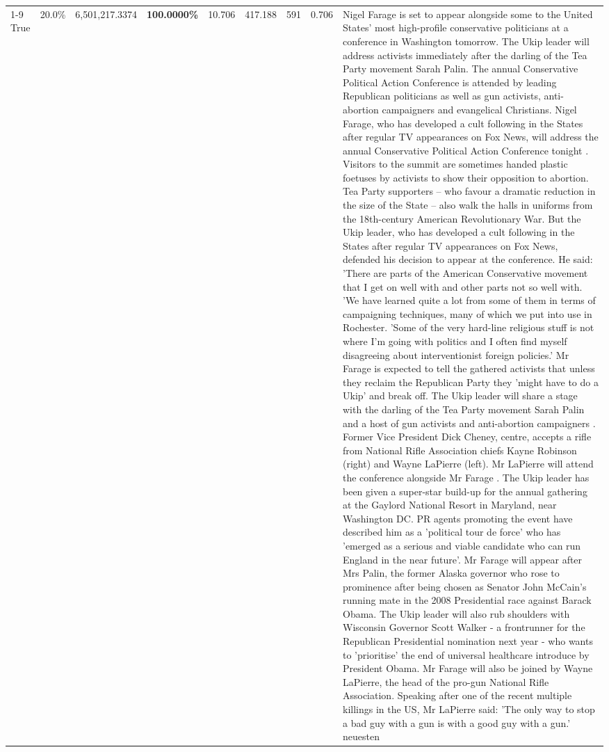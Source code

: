 \begin{table}[H]
\begin{tabular}{lllrlllll}
\cline{1-9}
True & 20.0\% & 6,501,217.3374 & \bfseries \color{red} 100.0000\% & 10.706 & 417.188 & 591 & 0.706 & Nigel Farage is set to appear alongside some to the United States' most high-profile conservative politicians at a conference in Washington tomorrow. The Ukip leader will address activists immediately after the darling of the Tea Party movement Sarah Palin. The annual Conservative Political Action Conference is attended by leading Republican politicians as well as gun activists, anti-abortion campaigners and evangelical Christians. Nigel Farage, who has developed a cult following in the States after regular TV appearances on Fox News, will address the annual Conservative Political Action Conference tonight . Visitors to the summit are sometimes handed plastic foetuses by activists to show their opposition to abortion. Tea Party supporters – who favour a dramatic reduction in the size of the State – also walk the halls in uniforms from the 18th-century American Revolutionary War. But the Ukip leader, who has developed a cult following in the States after regular TV appearances on Fox News, defended his decision to appear at the conference. He said: 'There are parts of the American Conservative movement that I get on well with and other parts not so well with. 'We have learned quite a lot from some of them in terms of campaigning techniques, many of which we put into use in Rochester. 'Some of the very hard-line religious stuff is not where I'm going with politics and I often find myself disagreeing about interventionist foreign policies.' Mr Farage is expected to tell the gathered activists that unless they reclaim the Republican Party they 'might have to do a Ukip' and break off. The Ukip leader will share a stage with the darling of the Tea Party movement Sarah Palin and a host of gun activists and anti-abortion campaigners . Former Vice President Dick Cheney, centre, accepts a rifle from National Rifle Association chiefs Kayne Robinson (right) and Wayne LaPierre (left). Mr LaPierre will attend the conference alongside Mr Farage . The Ukip leader has been given a super-star build-up for the annual gathering at the Gaylord National Resort in Maryland, near Washington DC. PR agents promoting the event have described him as a 'political tour de force' who has 'emerged as a serious and viable candidate who can run England in the near future'. Mr Farage will appear after Mrs Palin, the former Alaska governor who rose to prominence after being chosen as Senator John McCain's running mate in the 2008 Presidential race against Barack Obama. The Ukip leader will also rub shoulders with Wisconsin Governor Scott Walker - a frontrunner for the Republican Presidential nomination next year - who wants to 'prioritise' the end of universal healthcare introduce by President Obama. Mr Farage will also be joined by Wayne LaPierre, the head of the pro-gun National Rifle Association. Speaking after one of the recent multiple killings in the US, Mr LaPierre said: 'The only way to stop a bad guy with a gun is with a good guy with a gun.' neuesten \\

\end{tabular}
\end{table}
